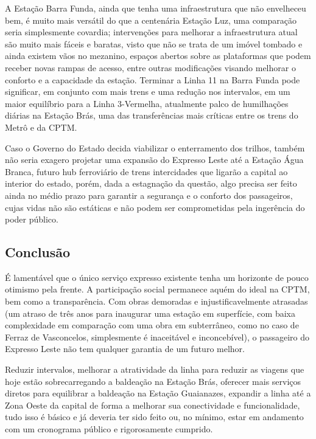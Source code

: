 \documentclass[11pt,fleqn]{book} %
\begin{document}
A Estação Barra Funda, ainda que tenha uma infraestrutura que não envelheceu bem, é muito mais versátil do que a centenária Estação Luz, uma comparação seria simplesmente covardia; intervenções para melhorar a infraestrutura atual são muito mais fáceis e baratas, visto que não se trata de um imóvel tombado e ainda existem vãos no mezanino, espaços abertos sobre as plataformas que podem receber novas rampas de acesso, entre outras modificações visando melhorar o conforto e a capacidade da estação. Terminar a Linha 11 na Barra Funda pode significar, em conjunto com mais trens e uma redução nos intervalos, em um maior equilíbrio para a Linha 3-Vermelha, atualmente palco de humilhações diárias na Estação Brás, uma das transferências mais críticas entre os trens do Metrô e da CPTM.

Caso o Governo do Estado decida viabilizar o enterramento dos trilhos, também não seria exagero projetar uma expansão do Expresso Leste até a Estação Água Branca, futuro hub ferroviário de trens intercidades que ligarão a capital ao interior do estado, porém, dada a estagnação da questão, algo precisa ser feito ainda no médio prazo para garantir a segurança e o conforto dos passageiros, cujas vidas não são estáticas e não podem ser comprometidas pela ingerência do poder público.

\subsection{Conclusão}

É lamentável que o único serviço expresso existente tenha um horizonte de pouco otimismo pela frente. A participação social permanece aquém do ideal na CPTM, bem como a transparência. Com obras demoradas e injustificavelmente atrasadas (um atraso de três anos para inaugurar uma estação em superfície, com baixa complexidade em comparação com uma obra em subterrâneo, como no caso de Ferraz de Vasconcelos, simplesmente é inaceitável e inconcebível), o passageiro do Expresso Leste não tem qualquer garantia de um futuro melhor.

Reduzir intervalos, melhorar a atratividade da linha para reduzir as viagens que hoje estão sobrecarregando a baldeação na Estação Brás, oferecer mais serviços diretos para equilibrar a baldeação na Estação Guaianazes, expandir a linha até a Zona Oeste da capital de forma a melhorar sua conectividade e funcionalidade, tudo isso é básico e já deveria ter sido feito ou, no mínimo, estar em andamento com um cronograma público e rigorosamente cumprido.
\end{document}
